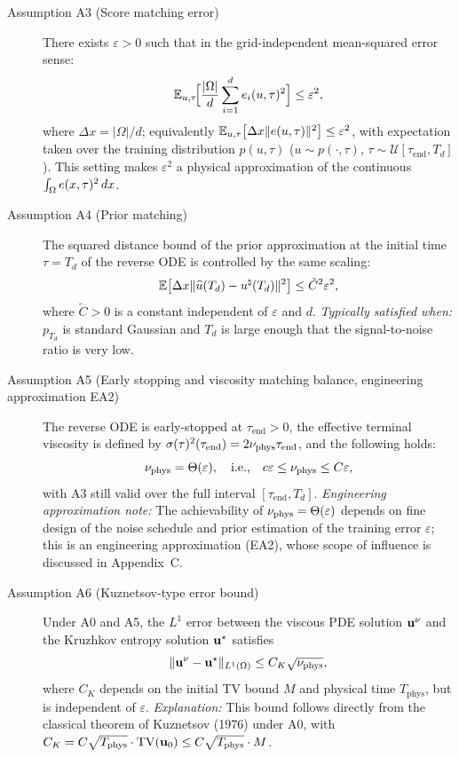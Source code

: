 \begin{description}
\item[Assumption A3 (Score matching error)]\label{ass:A3}
There exists $\varepsilon > 0$ such that in the grid-independent mean-squared error sense:
\begin{equation}
  \mathbb{E}_{u,\tau}\!\Bigl[ \frac{|\Omega|}{d} \sum_{i=1}^d e_i(u,\tau)^2 \Bigr] \leq \varepsilon^2,
\end{equation}
where $\Delta x = |\Omega|/d$; equivalently $\mathbb{E}_{u,\tau}\bigl[\Delta x \lVert e(u,\tau) \rVert^2\bigr] \leq \varepsilon^2$, with expectation taken over the training distribution $p(u,\tau)$ ($u \sim p(\cdot,\tau)$, $\tau \sim \mathcal{U}[\tau_{\mathrm{end}}, T_d]$).
This setting makes $\varepsilon^2$ a physical approximation of the continuous $\int_\Omega e(x,\tau)^2 \, dx$.

\item[Assumption A4 (Prior matching)]\label{ass:A4}
The squared distance bound of the prior approximation at the initial time $\tau = T_d$ of the reverse ODE is controlled by the same scaling:
\begin{equation}
  \mathbb{E}\bigl[\Delta x \lVert \widehat{u}(T_d) - u^{\natural}(T_d) \rVert^2 \bigr] \leq \tilde{C}^2 \varepsilon^2,
\end{equation}
where $\tilde{C} > 0$ is a constant independent of $\varepsilon$ and $d$.
\emph{Typically satisfied when:} $p_{T_d}$ is standard Gaussian and $T_d$ is large enough that the signal-to-noise ratio is very low.

\item[Assumption A5 (Early stopping and viscosity matching balance, engineering approximation EA2)]\label{ass:A5}
The reverse ODE is early-stopped at $\tau_{\mathrm{end}} > 0$, the effective terminal viscosity is defined by $\sigma(\tau)^2(\tau_{\mathrm{end}}) = 2\nu_{\mathrm{phys}} \tau_{\mathrm{end}}$, and the following holds:
\begin{equation}
  \nu_{\mathrm{phys}} = \Theta(\varepsilon), \quad \text{i.e.,} \quad c\varepsilon \leq \nu_{\mathrm{phys}} \leq C\varepsilon,
\end{equation}
with A3 still valid over the full interval $[\tau_{\mathrm{end}}, T_d]$.
\emph{Engineering approximation note:} The achievability of $\nu_{\mathrm{phys}} = \Theta(\varepsilon)$ depends on fine design of the noise schedule and prior estimation of the training error $\varepsilon$; this is an engineering approximation (EA2), whose scope of influence is discussed in Appendix~C.

\item[Assumption A6 (Kuznetsov-type error bound)]\label{ass:A6}
Under A0 and A5, the $L^1$ error between the viscous PDE solution $\mathbf{u}^{\nu}$ and the Kruzhkov entropy solution $\mathbf{u}^{\star}$ satisfies
\begin{equation}
  \lVert \mathbf{u}^{\nu} - \mathbf{u}^{\star} \rVert_{L^1(\Omega)} \leq C_K \sqrt{\nu_{\mathrm{phys}}},
\end{equation}
where $C_K$ depends on the initial TV bound $M$ and physical time $T_{\mathrm{phys}}$, but is independent of $\varepsilon$.
\emph{Explanation:} This bound follows directly from the classical theorem of Kuznetsov (1976) under A0, with $C_K = C \sqrt{T_{\mathrm{phys}}} \cdot \mathrm{TV}(\mathbf{u}_{0}) \leq C \sqrt{T_{\mathrm{phys}}} \cdot M$.
\end{description}

